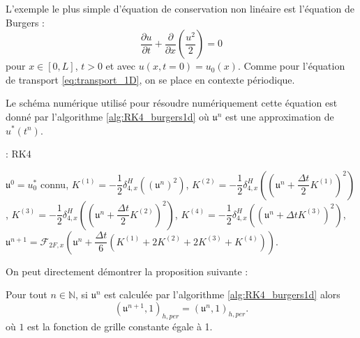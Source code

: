 L'exemple le plus simple d'équation de conservation non linéaire est l'équation de Burgers :
\begin{equation}
\dfrac{\partial u}{\partial t} + \dfrac{\partial}{\partial x} \left( \dfrac{u^2}{2}  \right) = 0
\label{eq:burgers_1D}
\end{equation}
pour $x \in [0,L]$, $t>0$ et avec $u(x,t=0)=u_0(x)$. Comme pour l'équation de transport \eqref{eq:transport_1D}, on se place en contexte périodique.

Le schéma numérique utilisé pour résoudre numériquement cette équation est donné par l'algorithme \ref{alg:RK4_burgers1d} où $\mathfrak{u}^n$ est une approximation de $u^*(t^n)$.
\begin{center}
\begin{minipage}[H]{12cm}
  \begin{algorithm}[H]
    \caption{: RK4}\label{alg:RK4_burgers1d}
    \begin{algorithmic}[1]
    \State $\mathfrak{u}^0 = u_0^*$ connu,
             \State  $K^{(1)} = - \dfrac{1}{2}\delta_{4,x}^H \left(\left( \mathfrak{u}^n \right)^2\right)$,
             \State  $K^{(2)} = - \dfrac{1}{2}\delta_{4,x}^H \left(\left( \mathfrak{u}^n + \dfrac{\Delta t}{2} K^{(1)}\right)^2\right)$,
             \State  $K^{(3)} = - \dfrac{1}{2}\delta_{4,x}^H \left(\left( \mathfrak{u}^n + \dfrac{\Delta t}{2} K^{(2)}\right)^2\right)$,
             \State  $K^{(4)} = - \dfrac{1}{2}\delta_{4,x}^H \left(\left( \mathfrak{u}^n + \Delta t K^{(3)}\right)^2\right)$,  
             \State  $\mathfrak{u}^{n+1} = \mathcal{F}_{2F,x}\left( \mathfrak{u}^n  + \dfrac{\Delta t}{6} \left( K^{(1)} + 2 K^{(2)} + 2 K^{(3)} + K^{(4)} \right) \right)$.
            \EndFor
    \end{algorithmic}
    \end{algorithm}
\end{minipage}
\end{center}

On peut directement démontrer la proposition suivante :
\begin{proposition}
Pour tout $n \in \mathbb{N}$, si $\mathfrak{u}^n$ est calculée par l'algorithme \ref{alg:RK4_burgers1d} alors
\begin{equation}
(\mathfrak{u}^{n+1}, \mathfrak{1})_{h,per} = (\mathfrak{u}^n, \mathfrak{1})_{h,per}.
\end{equation}
où $\mathfrak{1}$ est la fonction de grille constante égale à 1.
\end{proposition}

